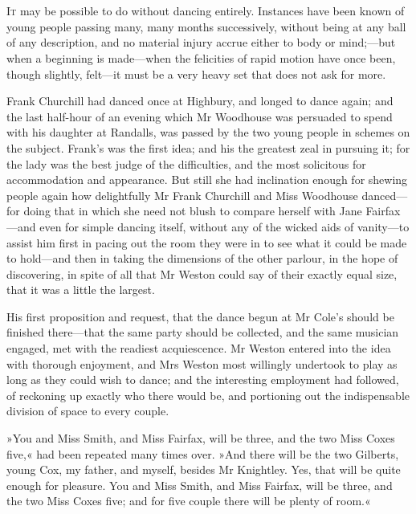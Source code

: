 \chapter[Chapter \thechapter]{}
\lettrine[lines=4,lraise=0.3]{I}{t} may be possible to do without dancing entirely. Instances have been known of young people passing many, many months successively, without being at any ball of any description, and no material injury accrue either to body or mind;—but when a beginning is made—when the felicities of rapid motion have once been, though slightly, felt—it must be a very heavy set that does not ask for more.

Frank Churchill had danced once at Highbury, and longed to dance again; and the last half-hour of an evening which Mr Woodhouse was persuaded to spend with his daughter at Randalls, was passed by the two young people in schemes on the subject. Frank's was the first idea; and his the greatest zeal in pursuing it; for the lady was the best judge of the difficulties, and the most solicitous for accommodation and appearance. But still she had inclination enough for shewing people again how delightfully Mr Frank Churchill and Miss Woodhouse danced—for doing that in which she need not blush to compare herself with Jane Fairfax—and even for simple dancing itself, without any of the wicked aids of vanity—to assist him first in pacing out the room they were in to see what it could be made to hold—and then in taking the dimensions of the other parlour, in the hope of discovering, in spite of all that Mr Weston could say of their exactly equal size, that it was a little the largest.

His first proposition and request, that the dance begun at Mr Cole's should be finished there—that the same party should be collected, and the same musician engaged, met with the readiest acquiescence. Mr Weston entered into the idea with thorough enjoyment, and Mrs Weston most willingly undertook to play as long as they could wish to dance; and the interesting employment had followed, of reckoning up exactly who there would be, and portioning out the indispensable division of space to every couple.

»You and Miss Smith, and Miss Fairfax, will be three, and the two Miss Coxes five,« had been repeated many times over. »And there will be the two Gilberts, young Cox, my father, and myself, besides Mr Knightley. Yes, that will be quite enough for pleasure. You and Miss Smith, and Miss Fairfax, will be three, and the two Miss Coxes five; and for five couple there will be plenty of room.«

